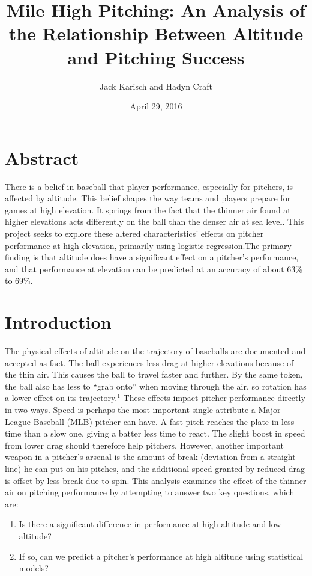 \documentclass{article}
\title{Mile High Pitching: An Analysis of the Relationship Between Altitude and Pitching Success}
\author{Jack Karisch and Hadyn Craft}
\date{April 29, 2016}
\begin{document}
\maketitle

\section{Abstract}

There is a belief in baseball that player performance, especially for pitchers, is affected by altitude. This belief shapes the way teams and players prepare for games at high elevation. It springs from the fact that the thinner air found at higher elevations acts differently on the ball than the denser air at sea level. This project seeks to explore these altered characteristics’ effects on pitcher performance at high elevation, primarily using logistic regression.The primary finding is that altitude does have a significant effect on a pitcher's performance, and that performance at elevation can be predicted at an accuracy of about 63\% to 69\%.

\section{Introduction}

The physical effects of altitude on the trajectory of baseballs are documented and accepted as fact. The ball experiences less drag at higher elevations because of the thin air. This causes the ball to travel faster and further. By the same token, the ball also has less to “grab onto” when moving through the air, so rotation has a lower effect on its trajectory.\(^{1}\) These effects impact pitcher performance directly in two ways. Speed is perhaps the most important single attribute a Major League Baseball (MLB) pitcher can have. A fast pitch reaches the plate in less time than a slow one, giving a batter less time to react. The slight boost in speed from lower drag should therefore help pitchers. However, another important weapon in a pitcher’s arsenal is the amount of break (deviation from a straight line) he can put on his pitches, and the additional speed granted by reduced drag is offset by less break due to spin. This analysis examines the effect of the thinner air on pitching performance by attempting to answer two key questions, which are:

\begin{enumerate}
    \item Is there a significant difference in performance at high altitude and low altitude?
    \item If so, can we predict a pitcher's performance at high altitude using statistical models?
\end{enumerate}
\end{document}
